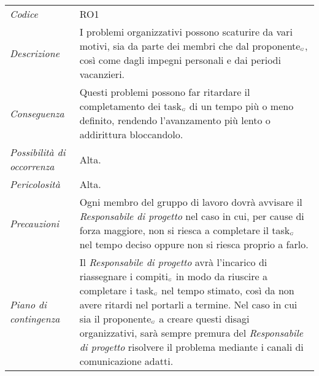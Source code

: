 {{{{	\begin{center}
		\renewcommand{\arraystretch}{1.4}
		\begin{longtable}{|p{5cm}|p{12cm}|}
			\hline
			\rowcolor{airforceblue}
			\multicolumn{2}{|c|}{\textit{Problemi organizzativi}}\\
			\hline
			\textit{Codice} & RO1 \\
			\hline
			\textit{Descrizione} & I problemi organizzativi possono scaturire da vari motivi, sia da parte dei membri che dal proponente$_{\scaleto{G}{3pt}}$, così come dagli impegni personali e dai periodi vacanzieri.  \\
			\hline
			\textit{Conseguenza} & Questi problemi possono far ritardare il completamento dei task$_{\scaleto{G}{3pt}}$ di un tempo più o meno definito, rendendo l'avanzamento più lento o addirittura bloccandolo. \\
			\hline
			\textit{Possibilità di occorrenza} & Alta. \\
			\hline
			\textit{Pericolosità} & Alta. \\
			\hline
			\textit{Precauzioni} & Ogni membro del gruppo di lavoro dovrà avvisare il \textit{Responsabile di progetto} nel caso in cui, per cause di forza maggiore, non si riesca a completare il task$_{\scaleto{G}{3pt}}$ nel tempo deciso oppure non si riesca proprio a farlo. \\
			\hline
			\textit{Piano di contingenza} & Il \textit{Responsabile di progetto} avrà l'incarico di riassegnare i compiti$_{\scaleto{G}{3pt}}$ in modo da riuscire a completare i task$_{\scaleto{G}{3pt}}$ nel tempo stimato, così da non avere ritardi nel portarli a termine.
			Nel caso in cui sia il proponente$_{\scaleto{G}{3pt}}$ a creare questi disagi organizzativi, sarà sempre premura del \textit{Responsabile di progetto} risolvere il problema mediante i canali di comunicazione adatti.  \\
			\hline
		\end{longtable}
	\end{center}


\def\tabularxcolumn#1{m{#1}}
{

}}}}}
